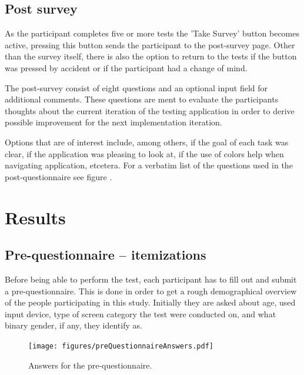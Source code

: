 \documentclass[nofilelist,dvipsnames]{cslthse-msc}
\begin{document}
{      \subsection{Post survey}

        As the participant completes five or more tests the 'Take Survey'
        button becomes active, pressing this button sends the participant to
        the post-survey page. Other than the survey itself, there is also the
        option to return to the tests if the button was pressed by accident or
        if the participant had a change of mind.

        The post-survey consist of eight questions and an optional input field
        for additional comments. These questions are ment to evaluate the
        participants thoughts about the current iteration of the testing
        application in order to derive possible improvement for the next
        implementation iteration.

        Options that are of interest include, among others, if the goal of each
        task was clear, if the application was pleasing to look at, if the use of
        colors help when navigating application, etcetera. For a verbatim list of
        the questions used in the post-questionnaire see figure
        .

		\section{Results}

			\subsection{Pre-questionnaire -- itemizations}

        Before being able to perform the test, each participant has to fill
        out and submit a pre-questionnaire. This is done in order to get
        a rough demographical overview of the people participating in this
        study. Initially they are asked about age, used input device, type of
        screen category the test were conducted on, and what binary gender, if
        any, they identify as.

				\begin{figure}[h!]
					\centering
					\texttt{[image: figures/preQuestionnaireAnswers.pdf]}
					\caption{Answers for the pre-questionnaire.}
				\end{figure}

}
\end{document}

